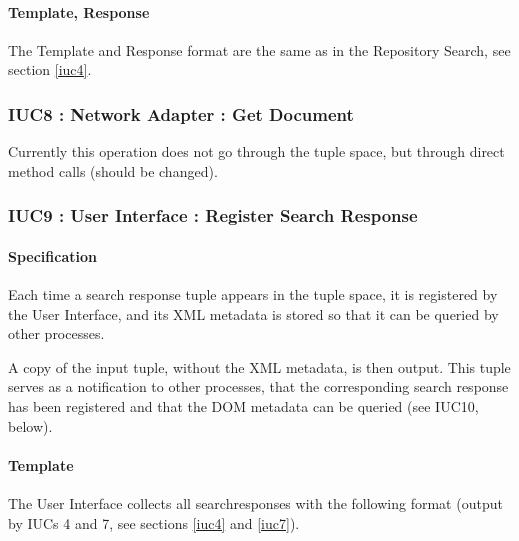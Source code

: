 \documentclass[titlepage]{article}%
\begin{document}
\paragraph{Template, Response}
The Template and Response format are the same as in the Repository Search, see section \ref{iuc4}.

\subsubsection{IUC8 : Network Adapter : Get Document}
\label{iuc8}
Currently this operation does not go through the tuple space, but through direct method calls (should be changed).


\subsubsection{IUC9 : User Interface : Register Search Response}
\label{iuc9}
\paragraph{Specification}
Each time a search response tuple appears in the tuple space, it is registered by the User Interface, and its XML metadata is stored so that it can be queried by other processes. 

A copy of the input tuple, without the XML metadata, is then output. This tuple serves as a notification to other processes, that the corresponding search response has been registered and that the DOM metadata can be queried (see IUC10, below).

\paragraph{Template}
The User Interface collects all searchresponses with the following format (output by IUCs 4 and 7, see sections \ref{iuc4} and \ref{iuc7}).
\begin{eqnarray*}
[\text{``SearchXpathAnswer"}; communityId; documentId; title; \\ filename; location; queryId; DOMmetadata]
\end{eqnarray*}
\end{document}
